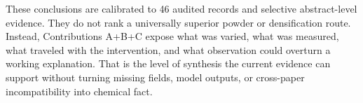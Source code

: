 These conclusions are calibrated to 46 audited records and selective abstract-level evidence. They do not rank a universally superior powder or densification route. Instead, Contributions A+B+C expose what was varied, what was measured, what traveled with the intervention, and what observation could overturn a working explanation. That is the level of synthesis the current evidence can support without turning missing fields, model outputs, or cross-paper incompatibility into chemical fact.
